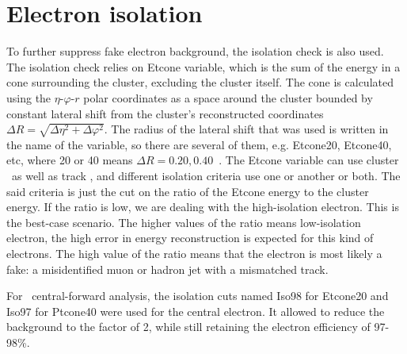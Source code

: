 \section{Electron isolation}
\label{sec:Rec_eleciso}

To further suppress fake electron background, the isolation check is also used. The isolation check relies on Etcone variable, which is the sum of the energy in a cone surrounding the cluster, excluding the cluster itself. The cone is calculated using the $\eta$-$\varphi$-$r$ polar coordinates as a space around the cluster bounded by constant lateral shift from the cluster's reconstructed coordinates $\Delta R = \sqrt{\Delta\eta^{2} + \Delta\varphi^{2}}$.  The radius of the lateral shift that was used is written in the name of the variable, so there are several of them, e.g. Etcone20, Etcone40, etc, where 20 or 40 means $\Delta R = 0.20 , 0.40$~\cite{lib:reco_iso}. The Etcone variable can use cluster \et\ as well as track \et, and different isolation criteria use one or another or both. The said criteria is just the cut on the ratio of the Etcone energy to the cluster energy. If the ratio is low, we are dealing with the high-isolation electron. This is the best-case scenario. The higher values of the ratio means low-isolation electron, the high error in energy reconstruction is expected for this kind of electrons. The high value of the ratio means that the electron is most likely a fake: a misidentified muon or hadron jet with a mismatched track.

\begin{figure}
\end{figure}

For \Zee\ central-forward analysis, the isolation cuts named Iso98 for Etcone20 and Iso97 for Ptcone40 were used for the central electron. It allowed to reduce the background to the factor of 2, while still retaining the electron efficiency of 97-98\%.
